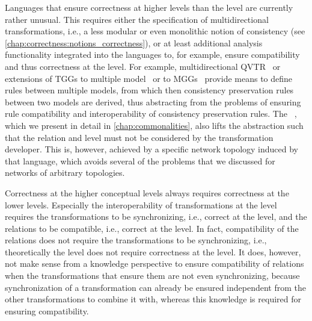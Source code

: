 Languages that ensure correctness at higher levels than the \leveltransformation level are currently rather unusual.
This requires either the specification of multidirectional transformations, i.e., a less modular or even monolithic notion of consistency (see \autoref{chap:correctness:notions_correctness}), or at least additional analysis functionality integrated into the languages to, for example, ensure compatibility and thus correctness at the \levelnetworkrule level.
For example, multidirectional \gls{QVTR}~\cite{macedo2014FrameworkMultiDirectional-BX} or extensions of \glspl{TGG} to multiple model~\cite{trollmann2015TransformationTGGtoMultiModel-ICMT,trollmann2016SynchronizationTGGtoMultiModel-ICMT} or to \glspl{MGG}~\cite{konigs2006MGGs-sosym} provide means to define rules between multiple models, from which then consistency preservation rules between two models are derived, thus abstracting from the problems of ensuring rule compatibility and interoperability of consistency  preservation rules.
The \commonalitieslanguage~\cite{gleitze2017a}, which we present in detail in \autoref{chap:commonalities}, also lifts the abstraction such that the relation and \levelnetworkrule level must not be considered by the transformation developer.
This is, however, achieved by a specific network topology induced by that language, which avoids several of the problems that we discussed for networks of arbitrary topologies.

Correctness at the higher conceptual levels always requires correctness at the lower levels.
Especially the interoperability of transformations at the \levelnetworkrule level requires the transformations to be synchronizing, i.e., correct at the \leveltransformation level, and the relations to be compatible, i.e., correct at the \levelnetworkrelation level.
In fact, compatibility of the relations does not require the transformations to be synchronizing, i.e., theoretically the \levelnetworkrelation level does not require correctness at the \leveltransformation level.
It does, however, not make sense from a knowledge perspective to ensure compatibility of relations when the transformations that ensure them are not even synchronizing, because synchronization of a transformation can already be ensured independent from the other transformations to combine it with, whereas this knowledge is required for ensuring compatibility.


